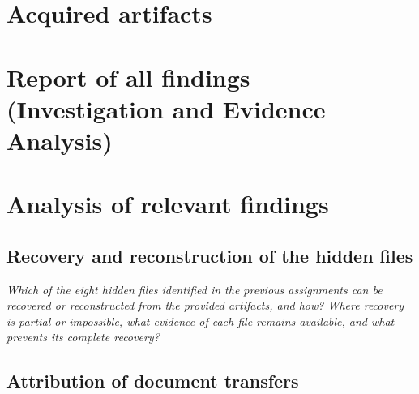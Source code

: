 \documentclass[11pt,a4paper,final,oneside]{article}
\begin{document}
\clearpage

\section{Acquired artifacts}
\label{sec:acquired_artifacts}


\section{Report of all findings (Investigation and Evidence Analysis)}
\label{sec:report-of-all-findings}


\section{Analysis of relevant findings}
\label{sec:analysis-of-relevant-findings}

\subsection{Recovery and reconstruction of the hidden files}

\textit{Which of the eight hidden files identified in the previous assignments can be recovered or reconstructed from the provided artifacts, and how? Where recovery is partial or impossible, what evidence of each file remains available, and what prevents its complete recovery?}


\subsection{Attribution of document transfers}
\end{document}
